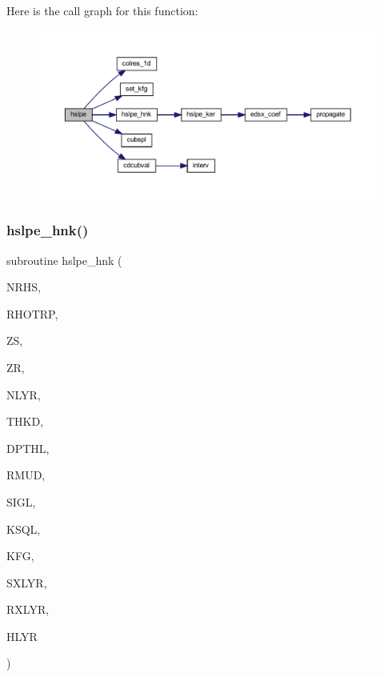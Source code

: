 Here is the call graph for this function\+:\nopagebreak
\begin{figure}[H]
\begin{center}
\leavevmode
\includegraphics[width=350pt]{Leroi__c_8f90_a918a25836d554d239ee900a00fbefbb6_cgraph}
\end{center}
\end{figure}
\mbox{\label{Leroi__c_8f90_adae61b12e3735bac162cd8f39a3607d3}} 
\subsubsection{\texorpdfstring{hslpe\+\_\+hnk()}{hslpe\_hnk()}}
{\footnotesize\ttfamily subroutine hslpe\+\_\+hnk (\begin{DoxyParamCaption}\item[{integer}]{N\+R\+HS,  }\item[{real, dimension(nrhs)}]{R\+H\+O\+T\+RP,  }\item[{real(kind=ql)}]{ZS,  }\item[{real(kind=ql)}]{ZR,  }\item[{integer}]{N\+L\+YR,  }\item[{real(kind=ql), dimension (nlyr)}]{T\+H\+KD,  }\item[{real(kind=ql), dimension (nlyr)}]{D\+P\+T\+HL,  }\item[{real(kind=ql), dimension(0\+:nlyr)}]{R\+M\+UD,  }\item[{complex(kind=ql), dimension (nlyr)}]{S\+I\+GL,  }\item[{complex(kind=ql), dimension (nlyr)}]{K\+S\+QL,  }\item[{integer}]{K\+FG,  }\item[{integer}]{S\+X\+L\+YR,  }\item[{integer}]{R\+X\+L\+YR,  }\item[{complex, dimension(nrhs,3)}]{H\+L\+YR }\end{DoxyParamCaption})}

